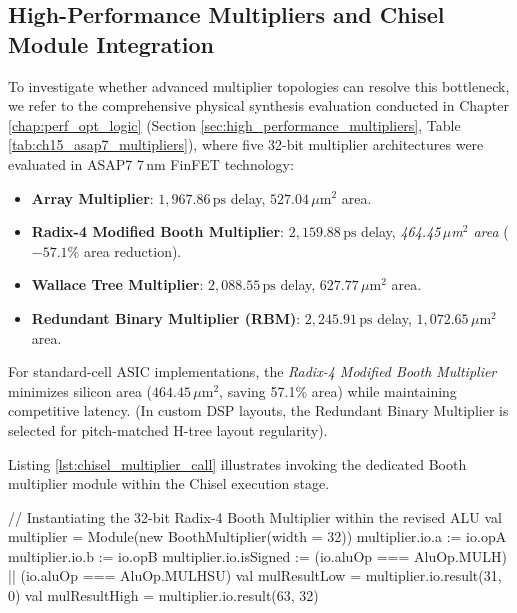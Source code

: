 \subsection{High-Performance Multipliers and Chisel Module Integration}

To investigate whether advanced multiplier topologies can resolve this bottleneck, we refer to the comprehensive physical synthesis evaluation conducted in Chapter \ref{chap:perf_opt_logic} (Section \ref{sec:high_performance_multipliers}, Table \ref{tab:ch15_asap7_multipliers}), where five 32-bit multiplier architectures were evaluated in ASAP7 7\,nm FinFET technology:
\begin{itemize}
    \item \textbf{Array Multiplier}: $1,967.86\,\text{ps}$ delay, $527.04\,\mu\text{m}^2$ area.
    \item \textbf{Radix-4 Modified Booth Multiplier}: $2,159.88\,\text{ps}$ delay, \textit{464.45\,$\mu$m$^2$ area} ($-57.1\%$ area reduction).
    \item \textbf{Wallace Tree Multiplier}: $2,088.55\,\text{ps}$ delay, $627.77\,\mu\text{m}^2$ area.
    \item \textbf{Redundant Binary Multiplier (RBM)}: $2,245.91\,\text{ps}$ delay, $1,072.65\,\mu\text{m}^2$ area.
\end{itemize}
For standard-cell ASIC implementations, the \textit{Radix-4 Modified Booth Multiplier} minimizes silicon area ($464.45\,\mu\text{m}^2$, saving 57.1\% area) while maintaining competitive latency. (In custom DSP layouts, the Redundant Binary Multiplier is selected for pitch-matched H-tree layout regularity).

Listing \ref{lst:chisel_multiplier_call} illustrates invoking the dedicated Booth multiplier module within the Chisel execution stage.

\begin{chiselcode}[caption={Calling the high-performance Booth Multiplier within the revised RISC-V ALU.},label={lst:chisel_multiplier_call}]
// Instantiating the 32-bit Radix-4 Booth Multiplier within the revised ALU
val multiplier = Module(new BoothMultiplier(width = 32))
multiplier.io.a        := io.opA
multiplier.io.b        := io.opB
multiplier.io.isSigned := (io.aluOp === AluOp.MULH) || (io.aluOp === AluOp.MULHSU)
val mulResultLow       = multiplier.io.result(31, 0)
val mulResultHigh      = multiplier.io.result(63, 32)
\end{chiselcode}

